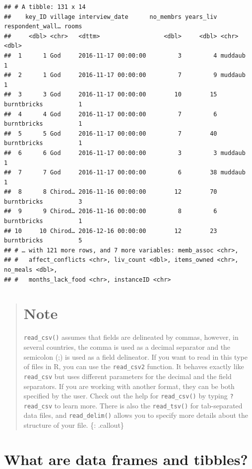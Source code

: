 \documentclass[]{book}
\begin{document}
\begin{verbatim}
## # A tibble: 131 x 14
##    key_ID village interview_date      no_membrs years_liv respondent_wall… rooms
##     <dbl> <chr>   <dttm>                  <dbl>     <dbl> <chr>            <dbl>
##  1      1 God     2016-11-17 00:00:00         3         4 muddaub              1
##  2      1 God     2016-11-17 00:00:00         7         9 muddaub              1
##  3      3 God     2016-11-17 00:00:00        10        15 burntbricks          1
##  4      4 God     2016-11-17 00:00:00         7         6 burntbricks          1
##  5      5 God     2016-11-17 00:00:00         7        40 burntbricks          1
##  6      6 God     2016-11-17 00:00:00         3         3 muddaub              1
##  7      7 God     2016-11-17 00:00:00         6        38 muddaub              1
##  8      8 Chirod… 2016-11-16 00:00:00        12        70 burntbricks          3
##  9      9 Chirod… 2016-11-16 00:00:00         8         6 burntbricks          1
## 10     10 Chirod… 2016-12-16 00:00:00        12        23 burntbricks          5
## # … with 121 more rows, and 7 more variables: memb_assoc <chr>,
## #   affect_conflicts <chr>, liv_count <dbl>, items_owned <chr>, no_meals <dbl>,
## #   months_lack_food <chr>, instanceID <chr>
\end{verbatim}

\begin{quote}
\section{Note}\label{note}

\texttt{read\_csv()} assumes that fields are delineated by commas,
however, in several countries, the comma is used as a decimal separator
and the semicolon (;) is used as a field delineator. If you want to read
in this type of files in R, you can use the \texttt{read\_csv2}
function. It behaves exactly like \texttt{read\_csv} but uses different
parameters for the decimal and the field separators. If you are working
with another format, they can be both specified by the user. Check out
the help for \texttt{read\_csv()} by typing \texttt{?read\_csv} to learn
more. There is also the \texttt{read\_tsv()} for tab-separated data
files, and \texttt{read\_delim()} allows you to specify more details
about the structure of your file. \{: .callout\}
\end{quote}

\section{What are data frames and
tibbles?}\label{what-are-data-frames-and-tibbles}
\end{document}
